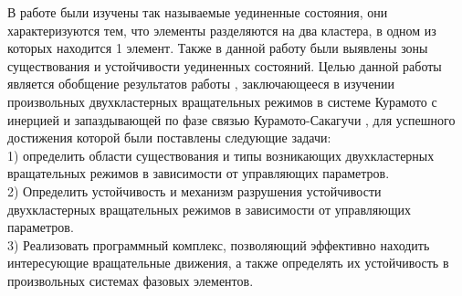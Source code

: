 В работе \cite{slava} были изучены так называемые уединенные состояния, они характеризуются тем, что элементы разделяются на два кластера,
в одном из которых находится 1 элемент. Также в данной работу были выявлены зоны существования и устойчивости уединенных состояний.
Целью данной работы является обобщение результатов работы \cite{slava}, заключающееся в изучении
произвольных двухкластерных вращательных режимов в системе Курамото
с инерцией и запаздывающей по фазе связью Курамото-Сакагучи \cite{Sakaguchi}, для успешного достижения которой были поставлены следующие задачи: \\
1) определить области существования и типы возникающих двухкластерных вращательных режимов в зависимости от управляющих параметров. \\
2) Определить устойчивость и механизм разрушения устойчивости двухкластерных вращательных режимов в зависимости от управляющих параметров. \\
3) Реализовать программный комплекс, позволяющий эффективно находить интересующие вращательные движения, а также определять
их устойчивость в произвольных системах фазовых элементов.
